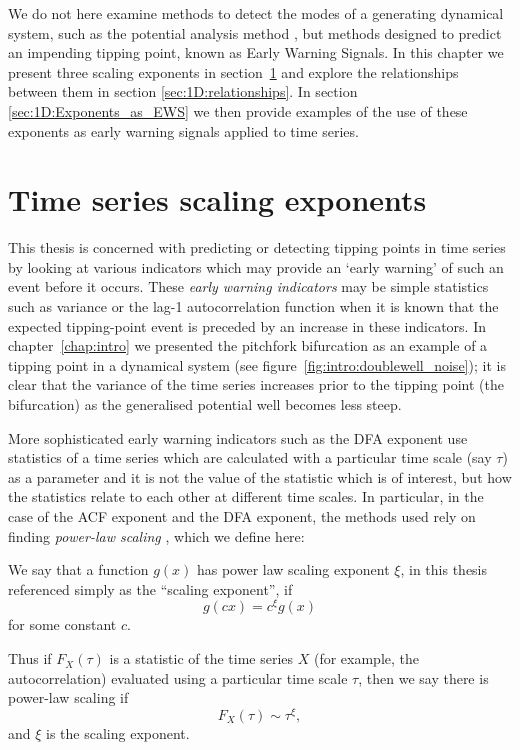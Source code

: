 We do not here examine methods to detect the modes of a generating dynamical system, such as the potential analysis method \citep{livina2011, livina2012}, but methods designed to predict an impending tipping point, known as Early Warning Signals. In this chapter we present three scaling exponents in section~\ref{sec:1D:scaling_exponents} and explore the relationships between them in section \ref{sec:1D:relationships}. In section \ref{sec:1D:Exponents_as_EWS} we then provide examples of the use of these exponents as early warning signals applied to time series.



\section{Time series scaling exponents}
\label{sec:1D:scaling_exponents}

{\Red
	
This thesis is concerned with predicting or detecting tipping points in time series by looking at various indicators which may provide an `early warning' of such an event before it occurs. These \emph{early warning indicators} may be simple statistics such as variance \citep{ashwin2012} or the lag-1 autocorrelation function \citep{held2004} when it is known that the expected tipping-point event is preceded by an increase in these indicators. In chapter~\ref{chap:intro} we presented the pitchfork bifurcation as an example of a tipping point in a dynamical system (see figure~\ref{fig:intro:doublewell_noise}); it is clear that the variance of the time series increases prior to the tipping point (the bifurcation) as the generalised potential well becomes less steep. 

More sophisticated early warning indicators such as the DFA exponent \citep{livina2007} use statistics of a time series which are calculated with a particular time scale (say $\tau$) as a parameter and it is not the value of the statistic which is of interest, but how the statistics relate to each other at different time scales. In particular, in the case of the ACF exponent and the DFA exponent, the methods used rely on finding \emph{power-law scaling} \citep{livina2007}, which we define here:
\begin{definition}
	\label{def:intro:scaling}
		We say that a function $g(x)$ has power law scaling exponent $\xi$, in this thesis referenced simply as the ``scaling exponent'', if 
		\begin{equation}
		\label{eqn:intro:scaling_def}
		g(cx) = c^\xi g(x)
		\end{equation}
		for some constant $c$. 
\end{definition}
Thus if $F_X(\tau)$ is a statistic of the time series $X$ (for example, the autocorrelation) evaluated using a particular time scale $\tau$, then we say there is power-law scaling if 
\begin{equation}
	F_X(\tau) \sim \tau^\xi,
\end{equation}
and $\xi$ is the scaling exponent. 

}


